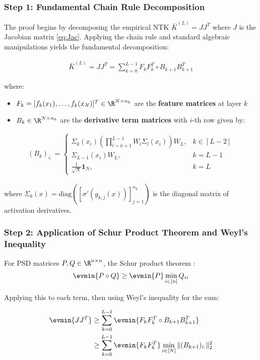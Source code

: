 \documentclass[a4paper]{article}
\begin{document}
\subsubsection{Step 1: Fundamental Chain Rule Decomposition}

The proof begins by decomposing the empirical NTK $\bar{K}^{(L)} = JJ^T$ where $J$ is the Jacobian matrix \eqref{eq:Jac}. Applying the chain rule and standard algebraic manipulations yields the fundamental decomposition:

\begin{align}
\bar{K}^{(L)} = JJ^T = \sum_{k=0}^{L-1} F_k F_k^T \circ B_{k+1} B_{k+1}^T
\end{align}

where:
\begin{itemize}
    \item $F_k = [f_k(x_1), \ldots, f_k(x_N)]^T \in \R^{N \times n_k}$ are the \textbf{feature matrices} at layer $k$
    \item $B_k \in \R^{N \times n_k}$ are the \textbf{derivative term matrices} with $i$-th row given by:
\end{itemize}

\begin{align}
(B_k)_{i:} = \begin{cases}
\Sigma_k(x_i) \left(\prod_{l=k+1}^{L-1} W_l \Sigma_l(x_i)\right) W_L, & k \in [L-2] \\
\Sigma_{L-1}(x_i) W_L, & k = L-1 \\
\frac{1}{\sqrt{N}} \mathbf{1}_N, & k = L
\end{cases}
\end{align}

where $\Sigma_k(x) = \text{diag}([\sigma'(g_{k,j}(x))]_{j=1}^{n_k})$ is the diagonal matrix of activation derivatives.

\subsubsection{Step 2: Application of Schur Product Theorem and Weyl's Inequality}

For PSD matrices $P, Q \in \R^{n \times n}$, the Schur product theorem :
\begin{align}
\evmin{P \circ Q} \geq \evmin{P} \min_{i \in [n]} Q_{ii}
\end{align}

Applying this to each term, then using Weyl's inequality for the sum:

\begin{align}
\evmin{JJ^T} &\geq \sum_{k=0}^{L-1} \evmin{F_k F_k^T \circ B_{k+1} B_{k+1}^T} \\
&\geq \sum_{k=0}^{L-1} \evmin{F_k F_k^T} \min_{i \in [N]} \|(B_{k+1})_{i:}\|_2^2
\end{align}
\end{document}
